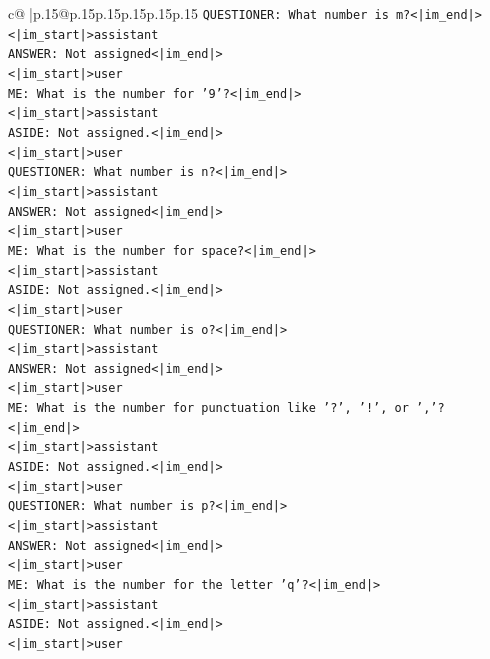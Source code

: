 \documentclass{article}
\begin{document}
{\begin{supertabular}{c@{$\;$}|p{.15\linewidth}@{}p{.15\linewidth}p{.15\linewidth}p{.15\linewidth}p{.15\linewidth}p{.15\linewidth}}
{{{\texttt{QUESTIONER: What number is m?<|im\_end|>} \\
\texttt{<|im\_start|>assistant} \\
\texttt{ANSWER: Not assigned<|im\_end|>} \\
\texttt{<|im\_start|>user} \\
\texttt{ME: What is the number for '9'?<|im\_end|>} \\
\texttt{<|im\_start|>assistant} \\
\texttt{ASIDE: Not assigned.<|im\_end|>} \\
\texttt{<|im\_start|>user} \\
\texttt{QUESTIONER: What number is n?<|im\_end|>} \\
\texttt{<|im\_start|>assistant} \\
\texttt{ANSWER: Not assigned<|im\_end|>} \\
\texttt{<|im\_start|>user} \\
\texttt{ME: What is the number for space?<|im\_end|>} \\
\texttt{<|im\_start|>assistant} \\
\texttt{ASIDE: Not assigned.<|im\_end|>} \\
\texttt{<|im\_start|>user} \\
\texttt{QUESTIONER: What number is o?<|im\_end|>} \\
\texttt{<|im\_start|>assistant} \\
\texttt{ANSWER: Not assigned<|im\_end|>} \\
\texttt{<|im\_start|>user} \\
\texttt{ME: What is the number for punctuation like '?', '!', or ','?<|im\_end|>} \\
\texttt{<|im\_start|>assistant} \\
\texttt{ASIDE: Not assigned.<|im\_end|>} \\
\texttt{<|im\_start|>user} \\
\texttt{QUESTIONER: What number is p?<|im\_end|>} \\
\texttt{<|im\_start|>assistant} \\
\texttt{ANSWER: Not assigned<|im\_end|>} \\
\texttt{<|im\_start|>user} \\
\texttt{ME: What is the number for the letter 'q'?<|im\_end|>} \\
\texttt{<|im\_start|>assistant} \\
\texttt{ASIDE: Not assigned.<|im\_end|>} \\
\texttt{<|im\_start|>user} \\
}}}
\end{supertabular}}
\end{document}
